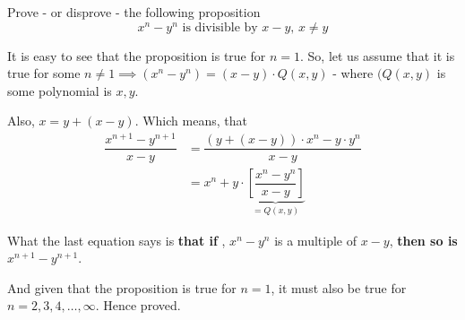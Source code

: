 
\question Prove - or disprove - the following proposition
\[ x^n - y^n \text{ is divisible by } x - y,\, x\neq y\]

\insertQR{}

\begin{solution}
  It is easy to see that the proposition is true for $n=1$. So, let us assume 
  that it is true for some $n\neq 1\implies (x^n-y^n) = (x-y)\cdot Q(x,y)$ - where
  $(Q(x,y)$ is some polynomial is $x,y$.

  Also, $x = y + (x-y)$. Which means, that 
  \begin{align}
    \dfrac{x^{n+1}-y^{n+1}}{x-y} &= 
    \dfrac{(y+(x-y))\cdot x^n - y\cdot y^n}{x-y} \\
    &= x^n + y\cdot\underbrace{\left[ \dfrac{x^n-y^n}{x-y} \right]}_{=Q(x,y)}
  \end{align}

  What the last equation says is \textbf{ that if }, $x^n-y^n$ is a multiple of $x-y$,
  \textbf{ then so is} $x^{n+1}-y^{n+1}$.

  And given that the proposition is true for $n=1$, it must also be true 
  for $n=2,3,4,\ldots,\infty$. Hence proved.
\end{solution}

